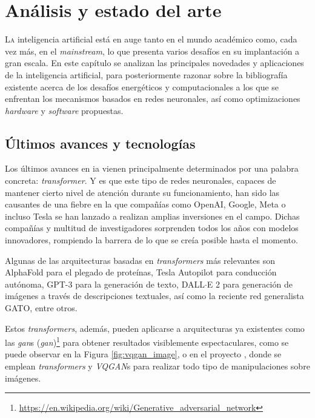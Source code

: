 \chapter{Análisis y estado del arte}
\label{chap:analisis_estado_arte}

\lettrine{L}{a} inteligencia artificial está en auge tanto en el mundo académico como, cada vez más, en el \textit{mainstream}, lo que presenta varios desafíos en su implantación a gran escala. En este capítulo se analizan las principales novedades y aplicaciones de la inteligencia artificial, para posteriormente razonar sobre la bibliografía existente acerca de los desafíos energéticos y computacionales a los que se enfrentan los mecanismos basados en redes neuronales, así como optimizaciones \textit{hardware} y \textit{software} propuestas.

\section{Últimos avances y tecnologías}
\label{sec:ultimos_avances_tecnologias}
Los últimos avances en \acrshort{ia} vienen principalmente determinados por una palabra concreta: \textit{transformer}. Y es que este tipo de redes neuronales, capaces de mantener cierto nivel de atención \cite{vaswani2017attention_all_you_need} durante su funcionamiento, han sido las causantes de una fiebre en la que compañías como OpenAI, Google, Meta o incluso Tesla se han lanzado a realizan amplias inversiones en el campo. Dichas compañías y multitud de investigadores sorprenden todos los años con modelos innovadores, rompiendo la barrera de lo que se creía posible hasta el momento.

Algunas de las arquitecturas basadas en \textit{transformers} más relevantes son AlphaFold para el plegado de proteínas, Tesla Autopilot para conducción autónoma, GPT-3 para la generación de texto, DALL$\cdot$E 2 para generación de imágenes a través de descripciones textuales, así como la reciente red generalista GATO, entre otros.

Estos \textit{transformers}, además, pueden aplicarse a arquitecturas ya existentes como las \textit{\acrshort{gan}}s (\textit{\acrlong{gan}})\footnote{\url{https://en.wikipedia.org/wiki/Generative\_adversarial\_network}} para obtener resultados visiblemente espectaculares, como se puede observar en la Figura \ref{fig:vqgan_image}, o en el proyecto \cite{chang2022maskgit}, donde se emplean \textit{transformers} y \textit{VQGAN}s para realizar todo tipo de manipulaciones sobre imágenes.

